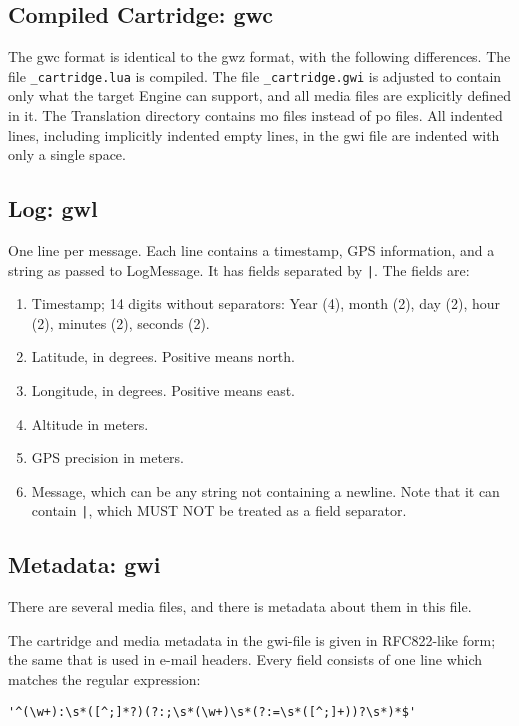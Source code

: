 \documentclass{article}
\begin{document}
\subsection{Compiled Cartridge: gwc}
The gwc format is identical to the gwz format, with the following differences.
The file \verb-_cartridge.lua- is compiled.  The file \verb-_cartridge.gwi- is
adjusted to contain only what the target Engine can support, and all media
files are explicitly defined in it.  The Translation directory contains mo
files instead of po files.  All indented lines, including implicitly indented
empty lines, in the gwi file are indented with only a single space.

\subsection{Log: gwl}
One line per message. Each line contains a timestamp, GPS information, and a string as passed to LogMessage. It has fields separated by \verb-|-. The fields are:
\begin{enumerate}
	\item Timestamp; 14 digits without separators: Year (4), month (2), day (2), hour (2), minutes (2), seconds (2).
	\item Latitude, in degrees. Positive means north.
	\item Longitude, in degrees. Positive means east.
	\item Altitude in meters.
	\item GPS precision in meters.
	\item Message, which can be any string not containing a newline. Note that it can contain \verb-|-, which MUST NOT be treated as a field separator.
\end{enumerate}

\subsection{Metadata: gwi}
There are several media files, and there is metadata about them in this file.

The cartridge and media metadata in the gwi-file is given in RFC822-like form;
the same that is used in e-mail headers. Every field consists of one line which
matches the regular expression:

\begin{center}\verb-'^(\w+):\s*([^;]*?)(?:;\s*(\w+)\s*(?:=\s*([^;]+))?\s*)*$'-\end{center}
\end{document}
